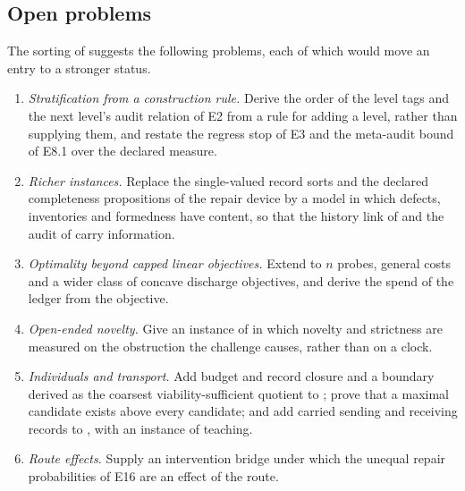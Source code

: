 \subsection{Open problems}\label{sec:scope-open}

The sorting of  suggests the following problems, each of which would move an entry
to a stronger status.
\begin{enumerate}
  \item \emph{Stratification from a construction rule.} Derive the order of the level tags and the
    next level's audit relation of E2 from a rule for adding a level, rather than supplying them, and
    restate the regress stop of E3 and the meta-audit bound of E8.1 over the declared measure.
  \item \emph{Richer instances.} Replace the single-valued record sorts and the declared completeness
    propositions of the repair device by a model in which defects, inventories and formedness have
    content, so that the history link of  and the audit of 
    carry information.
  \item \emph{Optimality beyond capped linear objectives.} Extend  to $n$ probes,
    general costs and a wider class of concave discharge objectives, and derive the spend of the
    ledger from the objective.
  \item \emph{Open-ended novelty.} Give an instance of  in which novelty and
    strictness are measured on the obstruction the challenge causes, rather than on a clock.
  \item \emph{Individuals and transport.} Add budget and record closure and a boundary derived as the
    coarsest viability-sufficient quotient to ; prove that a maximal candidate
    exists above every candidate; and add carried sending and receiving records to
    , with an instance of teaching.
  \item \emph{Route effects.} Supply an intervention bridge under which the unequal repair probabilities
    of E16 are an effect of the route.
\end{enumerate}
